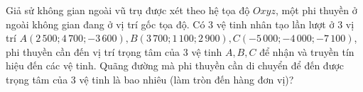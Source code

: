 \begin{bt}%
	Giả sử không gian ngoài vũ trụ được xét theo hệ tọa độ $Oxyz$, một phi thuyền ở ngoài không gian đang ở vị trí gốc tọa độ. Có $3$ vệ tinh nhân tạo lần lượt ở $3$ vị trí $A(2\,500;4\,700;-3\,600), B(3\,700;1\,100;2\,900), C(-5\,000;-4\,000;-7\,100)$, phi thuyền cần đến vị trí trọng tâm của $3$ vệ tinh $A,B,C$ để nhận và truyền tín hiệu đến các vệ tinh. Quãng đường mà phi thuyền cần di chuyển để đến được trọng tâm của $3$ vệ tinh là bao nhiêu (làm tròn đến hàng đơn vị)?
\end{bt}
